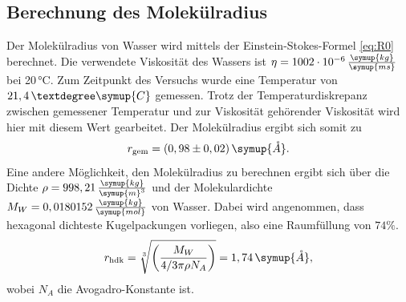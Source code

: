 \subsection{Berechnung des Molekülradius}
Der Molekülradius von Wasser wird mittels der Einstein-Stokes-Formel \autoref{eq:R0} berechnet. 
Die verwendete Viskosität des Wassers ist $\eta = 1002 \cdot 10^{-6}\, \frac{\symup{kg}}{\symup{m s}}$ \cite{visko}
bei 20\,°C. Zum Zeitpunkt des Versuchs wurde eine Temperatur von $21,4\, °\symup{C}$ gemessen.
Trotz der Temperaturdiskrepanz zwischen gemessener Temperatur und zur Viskosität gehörender Viskosität 
wird hier mit diesem Wert gearbeitet. Der Molekülradius ergibt sich somit zu 
\begin{equation*}
    r_{\text{gem}} = (0,98 \pm 0,02) \, \symup{\mathring{A}}. 
\end{equation*} 
Eine andere Möglichkeit, den Molekülradius zu berechnen ergibt sich über die Dichte $\rho = 998,21 \,\frac{\symup{kg}}{\symup{m}^3}$
und der Molekulardichte $M_W = 0,0180152 \, \frac{\symup{kg}}{\symup{mol}}$ von Wasser\cite{visko}.
Dabei wird angenommen, dass hexagonal dichteste Kugelpackungen vorliegen, also eine Raumfüllung von $74\%$.
\begin{equation*}
    r_{\text{hdk}} = \sqrt[3]{\left( \frac{M_W}{4/3 \pi \rho N_A}  \right)} = 1,74 \, \symup{\mathring{A}},
\end{equation*}
wobei $N_A$ die Avogadro-Konstante ist.